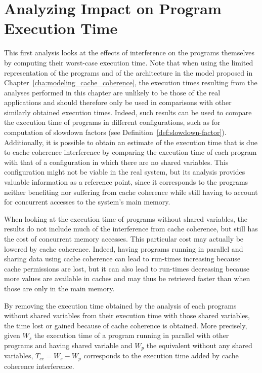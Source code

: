 \section{Analyzing Impact on Program Execution Time}
\label{sec:analysis:wcet}
This first analysis looks at the effects of interference on the programs
themselves by computing their worst-case execution time. Note that when using
the limited representation of the programs and of the architecture in the model
proposed in Chapter~\ref{cha:modeling_cache_coherence}, the execution times
resulting from the analyses performed in this chapter are unlikely to be those
of the real applications and should therefore only be used in comparisons with
other similarly obtained execution times. Indeed, such results can be used to
compare the execution time of programs in different configurations, such as for
computation of slowdown factors (see Definition~\ref{def:slowdown-factor}).
Additionally, it is possible to obtain an estimate of the execution time that
is due to cache coherence interference by comparing the execution time of each
program with that of a configuration in which there are no shared variables.
This configuration might not be viable in the real system, but its analysis
provides valuable information as a reference point, since it corresponds to the
programs neither benefiting nor suffering from cache coherence while still
having to account for concurrent accesses to the system's main memory.

When looking at the execution time of programs without shared variables,
the results do not include much of the interference from cache coherence, but
still has the cost of concurrent memory accesses. This particular cost may
actually be lowered by cache coherence. Indeed, having programs running in
parallel and sharing data using cache coherence can lead to run-times
increasing because cache permissions are lost, but it can also lead to
run-times decreasing because more values are available in caches and may thus
be retrieved faster than when those are only in the main memory.

By removing the execution time obtained by the analysis of each programs without
shared variables from their execution time with those shared variables, the time
lost or gained because of cache coherence is obtained. More precisely, given
$W_{s}$ the execution time of a program running in parallel with other programs
and having shared variable and $W_{p}$ the equivalent without any shared
variables, $T_{cc} = W_{s} - W_{p}$ corresponds to the execution time added by
cache coherence interference.

